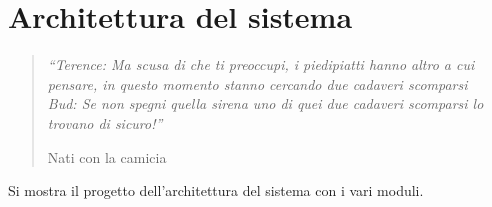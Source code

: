 \chapter{Architettura del sistema}
\label{ch5_arch}
\thispagestyle{empty}

\begin{quotation}
{\footnotesize
\noindent \emph{``Terence: Ma scusa di che ti preoccupi, i piedipiatti hanno altro a cui pensare, in questo momento stanno cercando due cadaveri scomparsi \\
Bud: Se non spegni quella sirena uno di quei due cadaveri scomparsi lo trovano di sicuro!''}
\begin{flushright}
Nati con la camicia
\end{flushright}
}
\end{quotation}
\vspace{0.5cm}

\noindent Si mostra il progetto dell'architettura del sistema con i vari moduli.
